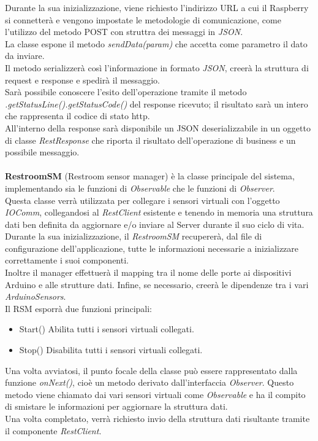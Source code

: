 \documentclass[12pt]{article}
\begin{document}
Durante la sua inizializzazione, viene richiesto l'indirizzo URL a cui il Raspberry si connetterà e vengono impostate le metodologie di comunicazione, come l'utilizzo del metodo POST con struttra dei messaggi in \textit{JSON}.\\
La classe espone il metodo \textit{sendData(param)} che accetta come parametro il dato da inviare.\\
Il metodo serializzerà così l'informazione in formato \textit{JSON}, creerà la struttura di request e response e spedirà il messaggio.\\
Sarà possibile conoscere l'esito dell'operazione tramite il metodo \textit{.getStatusLine()}\textit{.getStatusCode()} del response ricevuto; il risultato sarà un intero che rappresenta il codice di stato http.\\
All'interno della response sarà disponibile un JSON deserializzabile in un oggetto di classe \textit{RestResponse} che riporta il risultato dell'operazione di business e un possibile messaggio.\\\\
\textbf{RestroomSM} (Restroom sensor manager) è la classe principale del sistema, implementando sia le funzioni di \textit{Observable} che le funzioni di \textit{Observer}.\\
Questa classe verrà utilizzata per collegare i sensori virtuali con  l'oggetto \textit{IOComm}, collegandosi al \textit{RestClient} esistente e tenendo in memoria una struttura dati ben definita da aggiornare e/o inviare al Server durante il suo ciclo di vita.\\
Durante la sua inizializzazione, il \textit{RestroomSM} recupererà, dal file di configurazione dell'applicazione, tutte le informazioni necessarie a inizializzare correttamente i suoi componenti.\\
Inoltre il manager effettuerà il mapping tra il nome delle porte ai dispositivi Arduino e alle strutture dati. 
Infine, se necessario, creerà le dipendenze tra i vari \textit{ArduinoSensors}.\\
Il RSM esporrà due funzioni principali:
\begin{itemize}
\item Start() Abilita tutti i sensori virtuali collegati.
\item Stop() Disabilita tutti i sensori virtuali collegati.
\end{itemize}
Una volta avviatosi, il punto focale della classe può essere rappresentato dalla funzione \textit{onNext()}, cioè un metodo derivato dall'interfaccia \textit{Observer}.
Questo metodo viene chiamato dai vari sensori virtuali come \textit{Observable} e ha il compito di smistare le informazioni per aggiornare la struttura dati.\\
Una volta completato, verrà richiesto invio della struttura dati risultante tramite il componente \textit{RestClient}.
\newpage
\end{document}
